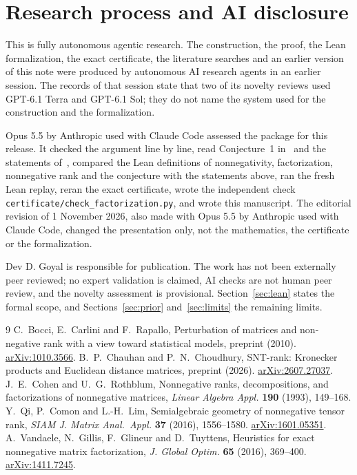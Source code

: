 \documentclass[11pt]{article}
\theoremstyle{remark}
\newcommand{\code}[1]{\nolinkurl{#1}}
\begin{document}
\section{Research process and AI disclosure}\label{sec:disclosure}

This is fully autonomous agentic research. The construction, the proof, the Lean formalization, the exact certificate, the literature searches and an earlier version of this note were produced by autonomous AI research agents in an earlier session. The records of that session state that two of its novelty reviews used GPT-6.1 Terra and GPT-6.1 Sol; they do not name the system used for the construction and the formalization.

Opus 5.5 by Anthropic used with Claude Code assessed the package for this release. It checked the argument line by line, read Conjecture~1 in~\cite{VGGT} and the statements of~\cite{CC}, compared the Lean definitions of nonnegativity, factorization, nonnegative rank and the conjecture with the statements above, ran the fresh Lean replay, reran the exact certificate, wrote the independent check \code{certificate/check\_factorization.py}, and wrote this manuscript. The editorial revision of 1 November 2026, also made with Opus 5.5 by Anthropic used with Claude Code, changed the presentation only, not the mathematics, the certificate or the formalization.

Dev D. Goyal is responsible for publication. The work has not been externally peer reviewed; no expert validation is claimed, AI checks are not human peer review, and the novelty assessment is provisional. Section~\ref{sec:lean} states the formal scope, and Sections~\ref{sec:prior} and~\ref{sec:limits} the remaining limits.

\begin{thebibliography}{9}
 C.~Bocci, E.~Carlini and F.~Rapallo, Perturbation of matrices and non-negative rank with a view toward statistical models, preprint (2010). \href{https://arxiv.org/abs/1010.3566}{arXiv:1010.3566}.
 B.~P.~Chauhan and P.~N.~Choudhury, SNT-rank: Kronecker products and Euclidean distance matrices, preprint (2026). \href{https://arxiv.org/abs/2607.27037}{arXiv:2607.27037}.
 J.~E.~Cohen and U.~G.~Rothblum, Nonnegative ranks, decompositions, and factorizations of nonnegative matrices, \emph{Linear Algebra Appl.} \textbf{190} (1993), 149--168.
 Y.~Qi, P.~Comon and L.-H.~Lim, Semialgebraic geometry of nonnegative tensor rank, \emph{SIAM J. Matrix Anal.\ Appl.} \textbf{37} (2016), 1556--1580. \href{https://arxiv.org/abs/1601.05351}{arXiv:1601.05351}.
 A.~Vandaele, N.~Gillis, F.~Glineur and D.~Tuyttens, Heuristics for exact nonnegative matrix factorization, \emph{J. Global Optim.} \textbf{65} (2016), 369--400. \href{https://arxiv.org/abs/1411.7245}{arXiv:1411.7245}.
\end{thebibliography}
\end{document}
